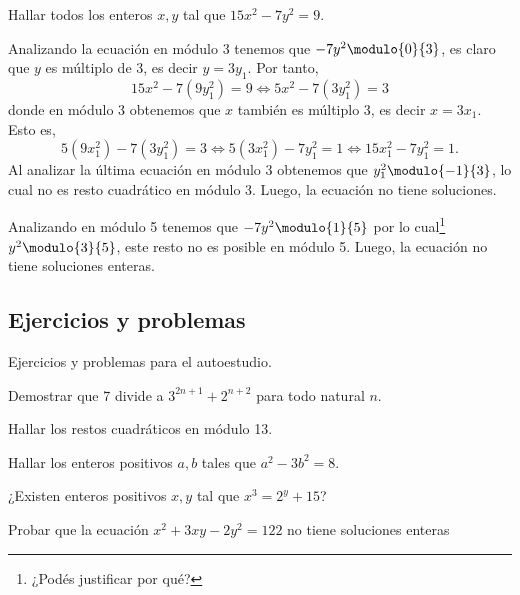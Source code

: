 \begin{example}
    Hallar todos los enteros $x,y$ tal que $15x^2 - 7y^2 = 9$.
\end{example}
\begin{solution}[1]
    Analizando la ecuación en módulo 3 tenemos que $-7y^2 \modulo{0}{3}$, es claro que $y$ es múltiplo de 3, es decir $y = 3y_1$.
    Por tanto,
    \[
        15x^2 - 7(9y_1^2) = 9 \iff 5x^2 - 7(3y_1^2) = 3
    \]
    donde en módulo 3 obtenemos que $x$ también es múltiplo 3, es decir $x = 3x_1$.
    Esto es,
    \[
        5(9x_1^2) - 7(3y_1^2) = 3 \iff 5(3x_1^2) - 7y_1^2 = 1 \iff 15x_1^2 - 7y_1^2 = 1.
    \]
    Al analizar la última ecuación en módulo 3 obtenemos que $y_1^2 \modulo{-1}{3}$, lo cual no es resto cuadrático en módulo 3.
    Luego, la ecuación no tiene soluciones.
\end{solution}

\begin{solution}[2]
    Analizando en módulo 5 tenemos que $-7y^2 \modulo{1}{5}$ por lo cual\footnote{¿Podés justificar por qué?} $y^2 \modulo{3}{5}$,
    este resto no es posible en módulo 5.
    Luego, la ecuación no tiene soluciones enteras.
\end{solution}


\subsection{Ejercicios y problemas}

Ejercicios y problemas para el autoestudio.

\begin{exercise}
    Demostrar que 7 divide a $3^{2n + 1} + 2^{n + 2}$ para todo natural $n$.
\end{exercise}

\begin{exercise}
    Hallar los restos cuadráticos en módulo 13.
\end{exercise}

\begin{exercise}
    Hallar los enteros positivos $a,b$ tales que $a^2 - 3b^2 = 8$.
\end{exercise}

\begin{exercise}
    ¿Existen enteros positivos $x,y$ tal que $x^3 = 2^y + 15$?
\end{exercise}

\begin{exercise}
    Probar que la ecuación $x^2 + 3xy - 2y^2 = 122$ no tiene soluciones enteras
\end{exercise}

